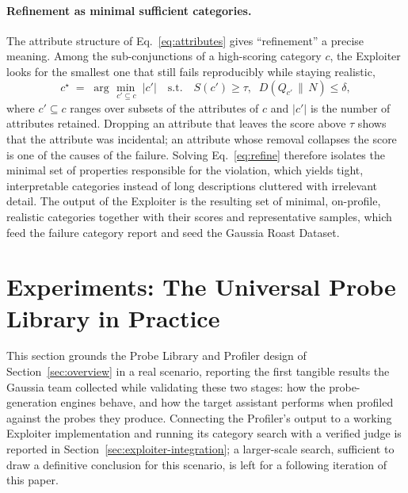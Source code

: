 \documentclass[11pt,a4paper]{article}
\begin{document}
\paragraph{Refinement as minimal sufficient categories.}
The attribute structure of Eq.~\eqref{eq:attributes} gives ``refinement'' a
precise meaning. Among the sub-conjunctions of a high-scoring category $c$, the
Exploiter looks for the smallest one that still fails reproducibly while staying realistic,
\begin{equation}
  c^\star \;=\; \arg\min_{\,c' \subseteq c}\; |c'|
  \quad \text{s.t.} \quad
  S(c') \ge \tau, \;\; D\!\left(Q_{c'} \,\|\, N\right) \le \delta,
  \label{eq:refine}
\end{equation}
where $c' \subseteq c$ ranges over subsets of the attributes of $c$ and $|c'|$ is
the number of attributes retained. Dropping an attribute that leaves the score
above $\tau$ shows that the attribute was incidental; an attribute whose removal
collapses the score is one of the causes of the failure. Solving
Eq.~\eqref{eq:refine} therefore isolates the minimal set of properties
responsible for the violation, which yields tight, interpretable categories
instead of long descriptions cluttered with irrelevant detail. The output of the
Exploiter is the resulting set of minimal, on-profile, realistic categories
together with their scores and representative samples, which feed the failure
category report and seed the Gaussia Roast Dataset.


\section{Experiments: The Universal Probe Library in Practice}
\label{sec:experiments}

This section grounds the Probe Library and Profiler design of
Section~\ref{sec:overview} in a real scenario, reporting the first tangible
results the Gaussia team collected while validating these two stages: how the
probe-generation engines behave, and how the target assistant performs when
profiled against the probes they produce. Connecting the Profiler's output to a working Exploiter implementation and
running its category search with a verified judge is reported in
Section~\ref{sec:exploiter-integration}; a larger-scale search, sufficient to
draw a definitive conclusion for this scenario, is left for a following
iteration of this paper.
\end{document}
